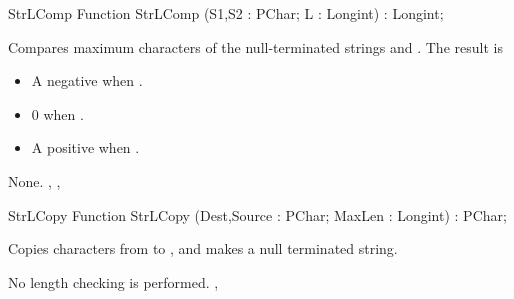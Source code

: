 \latex{}
\html{}
\begin{function}{StrLComp}
\Declaration
Function StrLComp (S1,S2 : PChar; L : Longint) : Longint;

\Description

Compares maximum  characters of the null-terminated strings 
 and . 
The result is 
\begin{itemize}
\item A negative  when .
\item 0 when .
\item A positive  when .
\end{itemize}

\Errors
None.
\SeeAlso
{}, , 
\end{function}
\latex{}
\html{}
\begin{function}{StrLCopy}
\Declaration
Function StrLCopy (Dest,Source : PChar; MaxLen : Longint) : PChar;

\Description

Copies  characters from  to , and makes
 a null terminated string. 

\Errors
No length checking is performed.
\SeeAlso
{}, 
\end{function}
 
